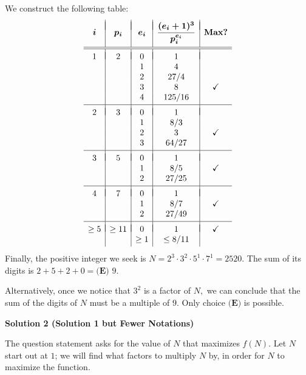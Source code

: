 \begin{enumerate}
 We construct the following table:
 \[\begin{array}{c|c|c|c|c}  & & & & \\ [-2.25ex] \boldsymbol{i} & \boldsymbol{p_i} & \boldsymbol{e_i} & \boldsymbol{\dfrac{(e_i+1)^3}{p_i^{e_i}}} & \textbf{Max?} \\ [2.5ex] \hline\hline  & & & & \\ [-2ex] 1 & 2 & 0 & 1 & \\      & & 1 & 4 & \\     & & 2 & 27/4 &\\     & & 3 & 8 & \checkmark\\     & & 4 & 125/16 & \\ [0.5ex] \hline   & & & & \\ [-2ex] 2 & 3 & 0 & 1 &\\     & & 1 & 8/3 & \\     & & 2 & 3 &  \checkmark\\     & & 3 & 64/27 &  \\ [0.5ex] \hline   & & & & \\ [-2ex] 3 & 5 & 0 & 1 &  \\     & & 1 & 8/5 &  \checkmark\\     & & 2 & 27/25 & \\ [0.5ex] \hline   & & & & \\ [-2ex] 4 & 7 & 0 & 1 &  \\     & & 1 & 8/7 &  \checkmark\\     & & 2 & 27/49 & \\ [0.5ex] \hline   & & & & \\ [-2ex] \geq5 & \geq11 & 0 & 1 & \checkmark \\     & & \geq1 & \leq8/11 &   \\ [0.5ex] \end{array}\]Finally, the positive integer we seek is $N=2^3\cdot3^2\cdot5^1\cdot7^1=2520.$ The sum of its digits is $2+5+2+0=\boxed{\textbf{(E) }9}.$

 Alternatively, once we notice that $3^2$ is a factor of $N,$ we can conclude that the sum of the digits of $N$ must be a multiple of $9.$ Only choice $\textbf{(E)}$ is possible.

 



\textbf{Solution 2 (Solution 1 but Fewer Notations)}

The question statement asks for the value of $N$ that maximizes $f(N)$. Let $N$ start out at $1$; we will find what factors to multiply $N$ by, in order for $N$ to maximize the function.


\end{enumerate}
